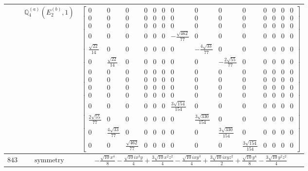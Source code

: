 \documentclass[fleqn,8pt,landscape]{jsarticle}
\begin{document}
\begin{longtable}{ccc}
$  $ & $ \mathbb{Q}_{4}^{(a)}(E_{2}^{(b)},1) $ & $ \begin{bmatrix} 0 & 0 & 0 & 0 & 0 & 0 & 0 & 0 & 0 & 0 & 0 & 0 & 0 & 0 \\ 0 & 0 & 0 & 0 & 0 & 0 & 0 & 0 & 0 & 0 & 0 & 0 & 0 & 0 \\ 0 & 0 & 0 & 0 & 0 & 0 & 0 & 0 & 0 & 0 & 0 & 0 & 0 & 0 \\ 0 & 0 & 0 & 0 & 0 & 0 & - \frac{\sqrt{462}}{77} & 0 & 0 & 0 & 0 & 0 & 0 & 0 \\ \frac{\sqrt{22}}{14} & 0 & 0 & 0 & 0 & 0 & 0 & - \frac{4 \sqrt{33}}{77} & 0 & 0 & 0 & 0 & 0 & 0 \\ 0 & \frac{\sqrt{22}}{14} & 0 & 0 & 0 & 0 & 0 & 0 & - \frac{2 \sqrt{55}}{77} & 0 & 0 & 0 & 0 & 0 \\ 0 & 0 & 0 & 0 & 0 & 0 & 0 & 0 & 0 & 0 & 0 & 0 & 0 & 0 \\ 0 & 0 & 0 & 0 & 0 & 0 & 0 & 0 & 0 & 0 & 0 & 0 & 0 & 0 \\ 0 & 0 & 0 & 0 & 0 & 0 & 0 & 0 & 0 & 0 & 0 & 0 & 0 & 0 \\ 0 & 0 & 0 & 0 & 0 & 0 & 0 & 0 & 0 & 0 & 0 & 0 & 0 & 0 \\ 0 & 0 & 0 & 0 & 0 & 0 & \frac{3 \sqrt{154}}{154} & 0 & 0 & 0 & 0 & 0 & 0 & 0 \\ \frac{2 \sqrt{55}}{77} & 0 & 0 & 0 & 0 & 0 & 0 & \frac{3 \sqrt{330}}{154} & 0 & 0 & 0 & 0 & 0 & 0 \\ 0 & \frac{4 \sqrt{33}}{77} & 0 & 0 & 0 & 0 & 0 & 0 & \frac{3 \sqrt{330}}{154} & 0 & 0 & 0 & 0 & 0 \\ 0 & 0 & \frac{\sqrt{462}}{77} & 0 & 0 & 0 & 0 & 0 & 0 & \frac{3 \sqrt{154}}{154} & 0 & 0 & 0 & 0 \end{bmatrix} $ \\ \hline
$ 843 $ & $ \text{symmetry} $ & $ - \frac{\sqrt{10} x^{4}}{8} - \frac{\sqrt{10} i x^{3} y}{4} + \frac{3 \sqrt{10} x^{2} z^{2}}{4} - \frac{\sqrt{10} i x y^{3}}{4} + \frac{3 \sqrt{10} i x y z^{2}}{2} + \frac{\sqrt{10} y^{4}}{8} - \frac{3 \sqrt{10} y^{2} z^{2}}{4} $ \\

\end{longtable}
\end{document}
